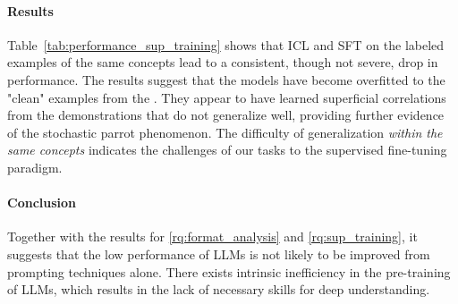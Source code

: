 \paragraph{Results} 

Table~\ref{tab:performance_sup_training} shows that ICL and SFT on the labeled examples of the same concepts lead to a consistent, though not severe, drop in performance.
The results suggest that the models have become overfitted to the "clean" examples from the \coredatasetns. They appear to have learned superficial correlations from the demonstrations that do not generalize well, providing further evidence of the stochastic parrot phenomenon.
The difficulty of generalization \emph{within the same concepts} indicates the challenges of our tasks to the supervised fine-tuning paradigm.

\paragraph{Conclusion} Together with the results for \ref{rq:format_analysis} and \ref{rq:sup_training}, it suggests that the low performance of LLMs is not likely to be improved from prompting techniques alone. There exists intrinsic inefficiency in the pre-training of LLMs, which results in the lack of necessary skills for deep understanding.






